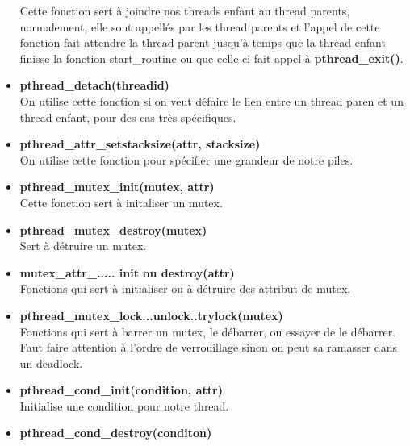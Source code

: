 \documentclass[oneside]{book}
\begin{document}
\begin{itemize}
Cette fonction sert à joindre nos threads enfant au thread parents, normalement, elle sont appellés par les thread parents et l'appel de cette fonction fait attendre la thread parent jusqu'à temps que la thread enfant finisse la fonction start\_routine ou que celle-ci fait appel à \textbf{pthread\_exit()}.\\

\item \textbf{pthread\_detach(threadid)}\\
On utilise cette fonction si on veut défaire le lien entre un thread paren et un thread enfant, pour des cas très spécifiques.\\

\item \textbf{pthread\_attr\_setstacksize(attr, stacksize)}\\
On utilise cette fonction pour spécifier une grandeur de notre piles.\\
\item \textbf{pthread\_mutex\_init(mutex, attr)}\\

Cette fonction sert à initaliser un mutex.\\

\item \textbf{pthread\_mutex\_destroy(mutex)}\\

Sert à détruire un mutex.\\

\item \textbf{mutex\_attr\_..... init ou destroy(attr)}\\

Fonctions qui sert à initialiser ou à détruire des attribut de mutex.

\item \textbf{pthread\_mutex\_lock...unlock..trylock(mutex)}\\

Fonctions qui sert à barrer un mutex, le débarrer, ou essayer de le débarrer. Faut faire attention à l'ordre de verrouillage sinon on peut sa ramasser dans un deadlock.

\item \textbf{pthread\_cond\_init(condition, attr)}\\

Initialise une condition pour notre thread.

\item \textbf{pthread\_cond\_destroy(conditon)}\\


\end{itemize}
\end{document}
